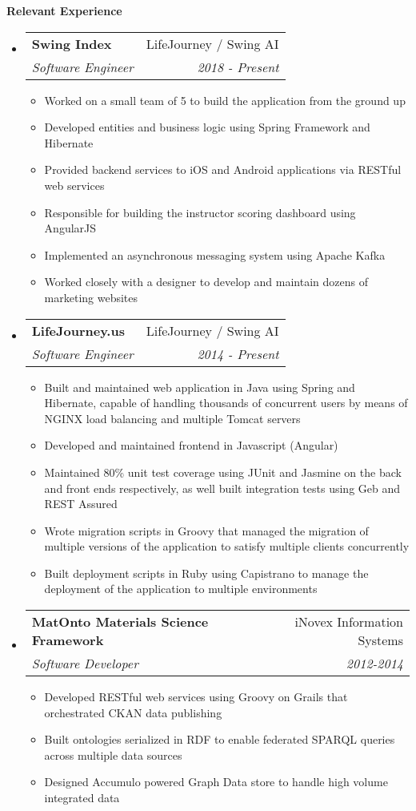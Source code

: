 \documentclass[letterpaper,11pt]{article}
\makeatletter
\newcommand{\resitem}[1]{\item #1 \vspace{-2pt}}
\newcommand{\resheading}[1]{{\large \colorbox{mygrey}{\begin{minipage}{\textwidth}{\textbf{#1 \vphantom{p\^{E}}}}\end{minipage}}}}
\newcommand{\ressubheading}[4]{
\begin{tabular*}{7.0in}{l@{\extracolsep{\fill}}r}
    \textbf{#1} & #2 \\
    \textit{#3} & \textit{#4} \\
\end{tabular*}\vspace{-6pt}}
\makeatother
\begin{document}
    \resheading{Relevant Experience}
    \begin{itemize}
		\item
		\ressubheading{Swing Index}{LifeJourney / Swing AI}{Software Engineer}{2018 - Present}
		\begin{itemize}
			\resitem{Worked on a small team of 5 to build the application from the ground up}
			\resitem{Developed entities and business logic using Spring Framework and Hibernate}
			\resitem{Provided backend services to iOS and Android applications via RESTful web services}
			\resitem{Responsible for building the instructor scoring dashboard using AngularJS}
			\resitem{Implemented an asynchronous messaging system using Apache Kafka}
			\resitem{Worked closely with a designer to develop and maintain dozens of marketing websites}
		\end{itemize}

        \item
        \ressubheading{LifeJourney.us}{LifeJourney / Swing AI}{Software Engineer}{2014 - Present}
        \begin{itemize}
            \resitem{Built and maintained web application in Java using Spring and Hibernate, capable of handling thousands of concurrent users by means of NGINX load balancing and multiple Tomcat servers}
            \resitem{Developed and maintained frontend in Javascript (Angular)}
            \resitem{Maintained 80\% unit test coverage using JUnit and Jasmine on the back and front ends respectively, as well built integration tests using Geb and REST Assured}
            \resitem{Wrote migration scripts in Groovy that managed the migration of multiple versions of the application to satisfy multiple clients concurrently}
            \resitem{Built deployment scripts in Ruby using Capistrano to manage the deployment of the application to multiple environments}
        \end{itemize}

        \item
        \ressubheading{MatOnto Materials Science Framework}{iNovex Information Systems}{Software Developer}{2012-2014}
        \begin{itemize}
            \resitem{Developed RESTful web services using Groovy on Grails that orchestrated CKAN data publishing}
            \resitem{Built ontologies serialized in RDF to enable federated SPARQL queries across multiple data sources}
			\resitem{Designed Accumulo powered Graph Data store to handle high volume integrated data}
        \end{itemize}

    \end{itemize}
\end{document}
